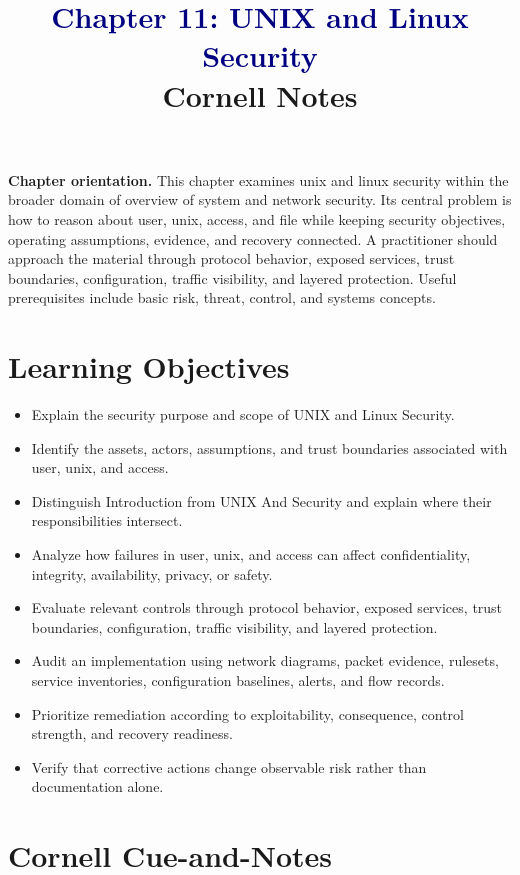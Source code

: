\documentclass[11pt]{article}
\title{\textcolor{Navy}{Chapter 11: UNIX and Linux Security}\\[2mm]\large Cornell Notes}
\author{}
\date{}
\begin{document}
\maketitle
\thispagestyle{fancy}
\vspace{-1.5em}
\begin{orientationbox}
\textbf{Chapter orientation.} This chapter examines unix and linux security within the broader domain of overview of system and network security. Its central problem is how to reason about user, unix, access, and file while keeping security objectives, operating assumptions, evidence, and recovery connected. A practitioner should approach the material through protocol behavior, exposed services, trust boundaries, configuration, traffic visibility, and layered protection. Useful prerequisites include basic risk, threat, control, and systems concepts.
\end{orientationbox}
\section*{Learning Objectives}
\begin{itemize}
\item Explain the security purpose and scope of UNIX and Linux Security.
\item Identify the assets, actors, assumptions, and trust boundaries associated with user, unix, and access.
\item Distinguish Introduction from UNIX And Security and explain where their responsibilities intersect.
\item Analyze how failures in user, unix, and access can affect confidentiality, integrity, availability, privacy, or safety.
\item Evaluate relevant controls through protocol behavior, exposed services, trust boundaries, configuration, traffic visibility, and layered protection.
\item Audit an implementation using network diagrams, packet evidence, rulesets, service inventories, configuration baselines, alerts, and flow records.
\item Prioritize remediation according to exploitability, consequence, control strength, and recovery readiness.
\item Verify that corrective actions change observable risk rather than documentation alone.
\end{itemize}
\section*{Cornell Cue-and-Notes}
\end{document}
